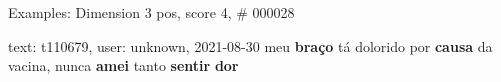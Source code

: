 \begin{frame}{Examples: Dimension 3 pos, score 4, \# 000028}
\footnotesize
\begin{exampleblock}{text: t110679, user: unknown, 2021-08-30}
meu \textbf{braço} tá dolorido por \textbf{causa} da vacina, nunca 
\textbf{amei} tanto \textbf{sentir} \textbf{dor} 
\end{exampleblock}
\end{frame}
